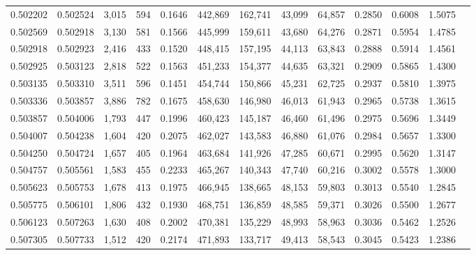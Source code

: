 \begin{tabular}{rrrrrrrrrrrrr}
0.502202 & 0.502524 &  3,015 &   594 &                                     0.1646 & 442,869 & 162,741 &  43,099 &  64,857 & 0.2850 & 0.6008 & 1.5075 \\
0.502569 & 0.502918 &  3,130 &   581 &                                     0.1566 & 445,999 & 159,611 &  43,680 &  64,276 & 0.2871 & 0.5954 & 1.4785 \\
0.502918 & 0.502923 &  2,416 &   433 &                                     0.1520 & 448,415 & 157,195 &  44,113 &  63,843 & 0.2888 & 0.5914 & 1.4561 \\
0.502925 & 0.503123 &  2,818 &   522 &                                     0.1563 & 451,233 & 154,377 &  44,635 &  63,321 & 0.2909 & 0.5865 & 1.4300 \\
0.503135 & 0.503310 &  3,511 &   596 &                                     0.1451 & 454,744 & 150,866 &  45,231 &  62,725 & 0.2937 & 0.5810 & 1.3975 \\
0.503336 & 0.503857 &  3,886 &   782 &                                     0.1675 & 458,630 & 146,980 &  46,013 &  61,943 & 0.2965 & 0.5738 & 1.3615 \\
0.503857 & 0.504006 &  1,793 &   447 &                                     0.1996 & 460,423 & 145,187 &  46,460 &  61,496 & 0.2975 & 0.5696 & 1.3449 \\
0.504007 & 0.504238 &  1,604 &   420 &                                     0.2075 & 462,027 & 143,583 &  46,880 &  61,076 & 0.2984 & 0.5657 & 1.3300 \\
0.504250 & 0.504724 &  1,657 &   405 &                                     0.1964 & 463,684 & 141,926 &  47,285 &  60,671 & 0.2995 & 0.5620 & 1.3147 \\
0.504757 & 0.505561 &  1,583 &   455 &                                     0.2233 & 465,267 & 140,343 &  47,740 &  60,216 & 0.3002 & 0.5578 & 1.3000 \\
0.505623 & 0.505753 &  1,678 &   413 &                                     0.1975 & 466,945 & 138,665 &  48,153 &  59,803 & 0.3013 & 0.5540 & 1.2845 \\
0.505775 & 0.506101 &  1,806 &   432 &                                     0.1930 & 468,751 & 136,859 &  48,585 &  59,371 & 0.3026 & 0.5500 & 1.2677 \\
0.506123 & 0.507263 &  1,630 &   408 &                                     0.2002 & 470,381 & 135,229 &  48,993 &  58,963 & 0.3036 & 0.5462 & 1.2526 \\
0.507305 & 0.507733 &  1,512 &   420 &                                     0.2174 & 471,893 & 133,717 &  49,413 &  58,543 & 0.3045 & 0.5423 & 1.2386 \\

\end{tabular}
